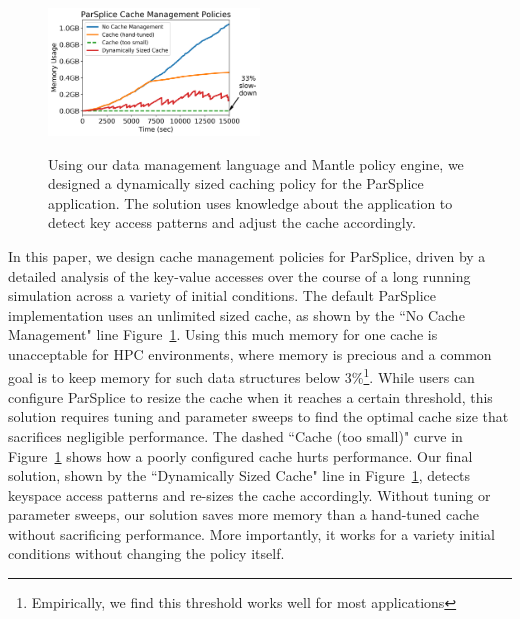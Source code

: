 \begin{figure}[t]
\noindent\includegraphics[width=0.5\textwidth]{figures/cache-management.png}\\

\caption{Using our data management language and Mantle policy engine, we
designed a dynamically sized caching policy for the ParSplice application. The
solution uses knowledge about the application to detect key access patterns and
adjust the cache accordingly. 
\label{fig:cache-management}}
\end{figure}

In this paper, we design cache management policies for ParSplice, driven by a
detailed analysis of the key-value accesses over the course of a long running
simulation across a variety of initial conditions. The default ParSplice
implementation uses an unlimited sized cache, as shown by the ``No Cache
Management" line Figure~\ref{fig:cache-management}. Using this much memory for
one cache is unacceptable for HPC environments, where memory is precious and a
common goal is to keep memory for such data structures below
3\%\footnote{Empirically, we find this threshold works well for most
applications}.  While users can configure ParSplice to resize the cache when it
reaches a certain threshold, this solution requires tuning and parameter sweeps
to find the optimal cache size that sacrifices negligible performance. The
dashed ``Cache (too small)" curve in Figure~\ref{fig:cache-management} shows
how a poorly configured cache hurts performance.  Our final solution, shown by
the ``Dynamically Sized Cache" line in Figure~\ref{fig:cache-management},
detects keyspace access patterns and re-sizes the cache accordingly.  Without
tuning or parameter sweeps, our solution saves more memory than a hand-tuned
cache without sacrificing performance.  More importantly, it works for a
variety initial conditions without changing the policy itself.

